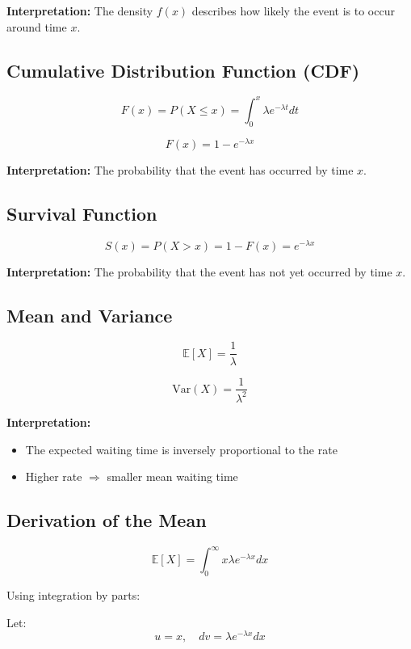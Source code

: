 \documentclass[10pt,a4paper]{article}
\begin{document}
		\textbf{Interpretation:}  
		The density $f(x)$ describes how likely the event is to occur around time $x$.
		
		
		
		\subsection{Cumulative Distribution Function (CDF)}
		
		
		\[
		F(x) = P(X \le x) = \int_0^x \lambda e^{-\lambda t} dt
		\]
		
		\[
		F(x) = 1 - e^{-\lambda x}
		\]
		
		\textbf{Interpretation:}  
		The probability that the event has occurred by time $x$.
		
		
		
		\subsection{Survival Function}
		
		\[
		S(x) = P(X > x) = 1 - F(x) = e^{-\lambda x}
		\]
		
		\textbf{Interpretation:}  
		The probability that the event has not yet occurred by time $x$.
		
		
		\subsection{Mean and Variance}
		
		\[
		\mathbb{E}[X] = \frac{1}{\lambda}
		\]
		
		\[
		\mathrm{Var}(X) = \frac{1}{\lambda^2}
		\]
		
		\textbf{Interpretation:}
		\begin{itemize}
		    \item The expected waiting time is inversely proportional to the rate
		    \item Higher rate $\Rightarrow$ smaller mean waiting time
		\end{itemize}
		
		
		\subsection{Derivation of the Mean}
		
		\[
		\mathbb{E}[X] = \int_0^{\infty} x \lambda e^{-\lambda x} dx
		\]
		
		Using integration by parts:
		
		Let:
		\[
		u = x, \quad dv = \lambda e^{-\lambda x} dx
		\]
		
\end{document}
